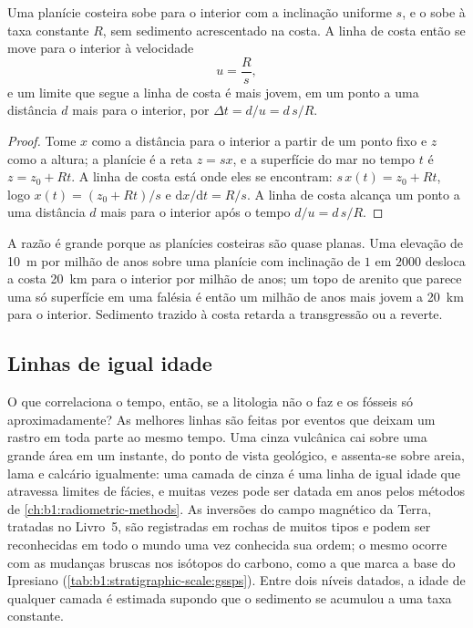 \begin{proposition}\label{prop:b1:stratigraphic-scale:transgression}
Uma planície costeira sobe para o interior com a inclinação uniforme $s$, e o  sobe à taxa constante $R$, sem sedimento acrescentado na costa. A linha de costa então
se move para o interior à velocidade
\[
  u = \frac{R}{s},
\]
e um limite que segue a linha de costa é mais jovem, em um ponto a uma distância $d$ mais para
o interior, por $\Delta t = d/u = d\,s/R$.
\end{proposition}

\begin{proof}
Tome $x$ como a distância para o interior a partir de um ponto fixo e $z$ como a altura; a
planície é a reta $z = s x$, e a superfície do mar no tempo $t$ é
$z = z_0 + R t$. A linha de costa está onde eles se encontram: $s\,x(t) = z_0 + R t$, logo
$x(t) = (z_0 + R t)/s$ e $\mathrm dx/\mathrm dt = R/s$. A linha de costa alcança um ponto a
uma distância $d$ mais para o interior após o tempo $d/u = d\,s/R$.
\end{proof}

A razão é grande porque as planícies costeiras são quase planas. Uma elevação de \qty{10}{m}
por milhão de anos sobre uma planície com inclinação de $1$ em $2000$ desloca a costa
\qty{20}{km} para o interior por milhão de anos; um topo de arenito que parece uma só
superfície em uma falésia é então um milhão de anos mais jovem a \qty{20}{km} para o
interior. Sedimento trazido à costa retarda a transgressão ou a reverte.

\subsection*{Linhas de igual idade}

O que correlaciona o tempo, então, se a litologia não o faz e os fósseis só aproximadamente?
As melhores linhas são feitas por eventos que deixam um rastro em toda parte ao mesmo tempo.
Uma cinza vulcânica cai sobre uma grande área em um instante, do ponto de vista geológico, e
assenta-se sobre areia, lama e calcário igualmente: uma camada de cinza é uma linha de igual
idade que atravessa limites de fácies, e muitas vezes pode ser datada em anos pelos métodos de
\cref{ch:b1:radiometric-methods}. As inversões do campo magnético da Terra, tratadas no
Livro~5, são registradas em rochas de muitos tipos e podem ser reconhecidas em todo o mundo
uma vez conhecida sua ordem; o mesmo ocorre com as mudanças bruscas nos isótopos do carbono,
como a que marca a base do Ipresiano (\cref{tab:b1:stratigraphic-scale:gssps}). Entre dois
níveis datados, a idade de qualquer camada é estimada supondo que o sedimento se acumulou a
uma taxa constante.

